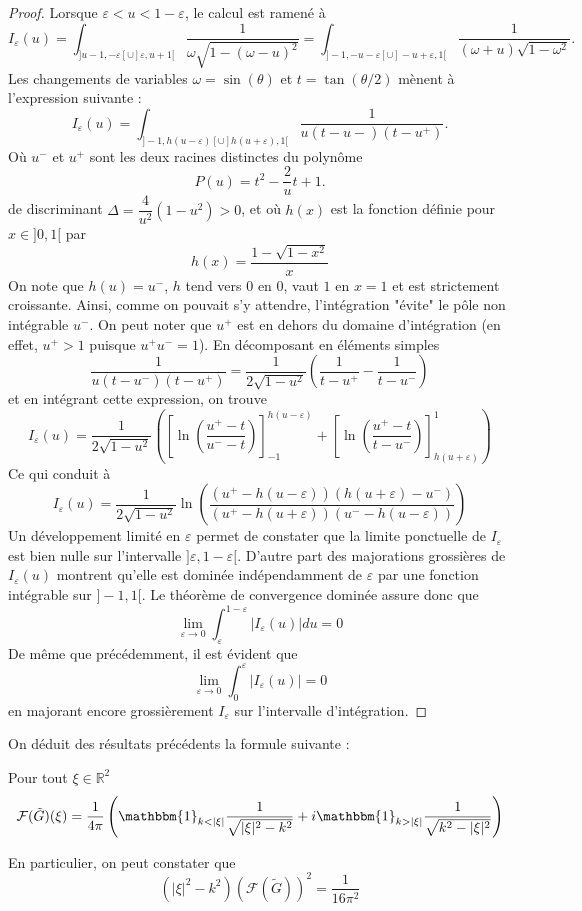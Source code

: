 \documentclass[11pt,a4paper]{article}
\begin{document}
\begin{Lem}
\begin{proof}
Lorsque $\varepsilon < u < 1-\varepsilon$, le calcul est ramené à 
\[I_\varepsilon(u) = \int_{]u-1,-\varepsilon[\cup]\varepsilon,u+1[} \dfrac{1}{\omega\sqrt{1-(\omega-u)^2}} = \int_{]-1,-u-\varepsilon[\cup]-u+\varepsilon,1[} \dfrac{1}{	(\omega+u)\sqrt{1-\omega^2}}.\]
Les changements de variables $\omega = \sin(\theta)$ et $t = \tan(\theta/2)$ mènent à l'expression suivante : 
\[ I_{\varepsilon}(u) = \int_{]-1,h(u-\varepsilon)[\cup]h(u+\varepsilon),1[} \dfrac{1}{u(t-u{-})(t-u^{+})}.\]
Où $u^{-}$ et $u^{+}$ sont les deux racines distinctes du polynôme 
\[P(u) = t^2 - \dfrac{2}{u}t + 1.\]
de discriminant $\Delta = \dfrac{4}{u^2}(1-u^2) >0$, et où $h(x)$ est la fonction définie pour $x \in ]0,1[$ par 
\[h(x) = \dfrac{1-\sqrt{1-x^2}}{x}\]  
On note que $h(u) = u^{-}$, $h$ tend vers $0$ en $0$, vaut $1$ en $x=1$ et est strictement croissante. Ainsi, comme on pouvait s'y attendre, l'intégration "évite" le pôle non intégrable $u^{-}$. On peut noter que $u^+$ est en dehors du domaine d'intégration (en effet, $u^{+}>1$ puisque $u^+ u^- = 1$). En décomposant en éléments simples 
\[ \dfrac{1}{u(t-u^-)(t-u^+)} = \dfrac{1}{2\sqrt{1-u^2}}\left(\dfrac{1}{t-u^+} - \dfrac{1}{t-u^-}\right)\] 
et en intégrant cette expression, on trouve
\[ I_\varepsilon(u) = \dfrac{1}{2\sqrt{1-u^2}} \left(\left[\ln\left(\dfrac{u^+-t}{u^--t}\right)\right]_{-1}^{h(u-\varepsilon)} + \left[\ln\left(\dfrac{u^+-t}{t-u^-}\right)\right]_{h(u+\varepsilon)}^{1}\right)\]
Ce qui conduit à 
\[I_{\varepsilon}(u) = \dfrac{1}{2\sqrt{1-u^2}}\ln\left(\dfrac{(u^+ - h(u-\varepsilon))(h(u+\varepsilon)-u^-)}{(u^+-h(u+\varepsilon))(u^--h(u-\varepsilon))}\right)\]
Un développement limité en $\varepsilon$ permet de constater que la limite ponctuelle de $I_\varepsilon$ est bien nulle sur l'intervalle $]\varepsilon,1-\varepsilon[$. D'autre part des majorations grossières de $I_\varepsilon(u)$ montrent qu'elle est dominée indépendamment de $\varepsilon$ par une fonction intégrable sur $]-1,1[$. Le théorème de convergence dominée assure donc que 
\[ \lim_{\varepsilon\to 0} \int_{\varepsilon}^{1-\varepsilon} |I_{\varepsilon}(u)|du = 0\]
De même que précédemment, il est évident que 
\[ \lim_{\varepsilon \to 0} \int_{0}^{\varepsilon}|I_{\varepsilon}(u)| = 0 \]
en majorant encore grossièrement $I_\varepsilon$ sur l'intervalle d'intégration. 
\end{proof}
\end{Lem}

On déduit des résultats précédents la formule suivante :
\begin{Lem} Pour tout $\xi \in \mathbb{R}^{2}$
\[ \mathcal{F}(\tilde{G})(\xi) = \dfrac{1}{4\pi}\left(\mathbbm{1}_{k < |\xi|}\dfrac{1}{\sqrt{|\xi|^2-k^2}} + i \mathbbm{1}_{k > |\xi|}\dfrac{1}{\sqrt{k^2-|\xi|^2}}\right) \]
\end{Lem}
En particulier, on peut constater que 
\[(|\xi|^2-k^2) (\mathcal{F}(\tilde{G}))^2 = \dfrac{1}{16\pi^2}\]
\end{document}
